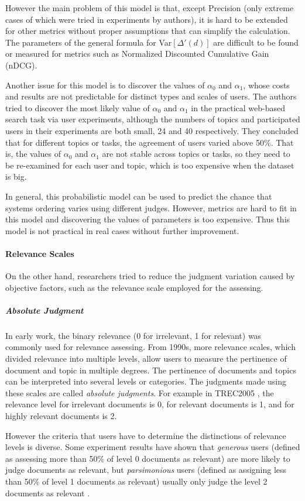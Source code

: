 \documentclass{article}
\begin{document}
However the main problem of this model is that, except Precision (only extreme cases of which were tried in experiments by authors), it is hard to be extended for other metrics without proper assumptions that can simplify the calculation. The parameters of the general formula for Var$[\Delta'(d)]$ are difficult to be found or measured for metrics such as Normalized Discounted Cumulative Gain (nDCG). 

Another issue for this model is to discover the values of $\alpha_0$ and $\alpha_1$, whose costs and results  are not predictable for distinct types and scales of users. The authors tried to discover the most likely value of $\alpha_0$ and $\alpha_1$ in the practical web-based search task via user experiments, although the numbers of topics and participated users in their experiments are both small, 24 and 40 respectively. They concluded that for different topics or tasks, the agreement of users varied above 50\%. That is, the values of $\alpha_0$ and $\alpha_1$ are not stable across topics or tasks, so they need to be re-examined for each user and topic, which is too expensive when the dataset is big.

In general, this probabilistic model can be used to predict the chance that systems ordering varies using different judges. However, metrics are hard to fit in this model and discovering the values of parameters is too expensive. Thus this model is not practical in real cases without further improvement.


\paragraph{Relevance Scales}
On the other hand, researchers tried to reduce the judgment variation caused by objective factors, such as the relevance scale employed for the assessing.
\subparagraph{Absolute Judgment}
In early work, the binary relevance (0 for irrelevant, 1 for relevant) was commonly used for relevance assessing. From 1990s, more relevance scales, which divided relevance into multiple levels, allow users to measure the pertinence of document and topic in multiple degrees. The pertinence of documents and topics can be interpreted into several levels or categories. The judgments made using these scales are called \textit{absolute judgments}. For example in TREC2005 \cite{TREC.2005}, the relevance level for irrelevant documents is 0, for relevant documents is 1, and for highly relevant documents is 2. 

However the criteria that users have to determine the distinctions of relevance levels is diverse. Some experiment results \cite{measure.rel.criteria} have shown that \textit{generous} users (defined as assessing more than 50\% of level 0 documents as relevant) are more likely to judge documents as relevant, but \textit{parsimonious} users (defined as assigning less than 50\% of level 1 documents as relevant) usually only judge the level 2 documents as relevant \cite{metric.rel.mismatch}.
\end{document}
